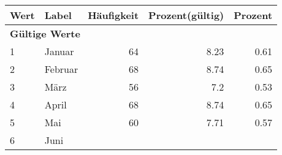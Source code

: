      \begin{longtable}{lXrrr}
     \toprule
     \textbf{Wert} & \textbf{Label} & \textbf{Häufigkeit} & \textbf{Prozent(gültig)} & \textbf{Prozent} \\
     \endhead
     \midrule
     \multicolumn{5}{l}{\textbf{Gültige Werte}}\\

     1 &
     \multicolumn{1}{X}{ Januar   } &


       \num{64} &
       \num[round-mode=places,round-precision=2]{8.23} &
         \num[round-mode=places,round-precision=2]{0.61} \\

     2 &
     \multicolumn{1}{X}{ Februar   } &


       \num{68} &
       \num[round-mode=places,round-precision=2]{8.74} &
         \num[round-mode=places,round-precision=2]{0.65} \\

     3 &
     \multicolumn{1}{X}{ März   } &


       \num{56} &
       \num[round-mode=places,round-precision=2]{7.2} &
         \num[round-mode=places,round-precision=2]{0.53} \\

     4 &
     \multicolumn{1}{X}{ April   } &


       \num{68} &
       \num[round-mode=places,round-precision=2]{8.74} &
         \num[round-mode=places,round-precision=2]{0.65} \\

     5 &
     \multicolumn{1}{X}{ Mai   } &


       \num{60} &
       \num[round-mode=places,round-precision=2]{7.71} &
         \num[round-mode=places,round-precision=2]{0.57} \\

     6 &
     \multicolumn{1}{X}{ Juni   } &



\end{longtable}
